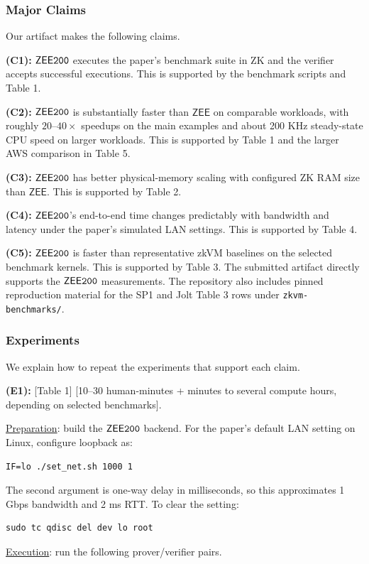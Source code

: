\documentclass[nonacm,sigconf]{acmart}
\newcommand{\oursystem}{$\mathsf{ZEE}\tt{200}$\xspace}
\newcommand{\zee}[0]{\ensuremath{\mathsf{ZEE}}\xspace}
\begin{document}
\subsubsection{Major Claims}
Our artifact makes the following claims.

\textbf{(C1):} \oursystem executes the paper's benchmark suite in ZK and
the verifier accepts successful executions. This is supported by the
benchmark scripts and Table 1.

\textbf{(C2):} \oursystem is substantially faster than \zee on
comparable workloads, with roughly $20$--$40\times$ speedups on the main
examples and about 200 KHz steady-state CPU speed on larger workloads.
This is supported by Table 1 and the larger AWS comparison in Table 5.

\textbf{(C3):} \oursystem has better physical-memory scaling with
configured ZK RAM size than \zee. This is supported by Table 2.

\textbf{(C4):} \oursystem's end-to-end time changes predictably with
bandwidth and latency under the paper's simulated LAN settings. This is
supported by Table 4.

\textbf{(C5):} \oursystem is faster than representative zkVM baselines
on the selected benchmark kernels. This is supported by Table 3. The
submitted artifact directly supports the \oursystem measurements. The
repository also includes pinned reproduction material for the SP1 and
Jolt Table 3 rows under \texttt{zkvm-benchmarks/}.

\subsubsection{Experiments}
We explain how to repeat the experiments that support each claim.

\textbf{(E1):} [Table 1] [10--30 human-minutes + minutes to several
compute hours, depending on selected benchmarks].

\noindent
\underline{Preparation}: build the \oursystem backend. For the paper's
default LAN setting on Linux, configure loopback as:
\begin{verbatim}
IF=lo ./set_net.sh 1000 1
\end{verbatim}
The second argument is one-way delay in milliseconds, so this
approximates 1 Gbps bandwidth and 2 ms RTT. To clear the setting:
\begin{verbatim}
sudo tc qdisc del dev lo root
\end{verbatim}

\noindent
\underline{Execution}: run the following prover/verifier pairs.
\end{document}
